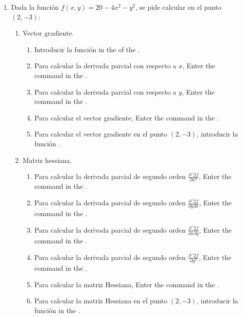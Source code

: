 \begin{enumerate}[leftmargin=*]
\item Dada la función $f(x,y)=20-4x^2-y^2$, se pide calcular en el punto $(2,-3)$:
      \begin{enumerate}
      \item Vector gradiente.
            \begin{indication}
            \begin{enumerate}
            \item Introducir la función  in the  of the  .
            \item Para calcular la derivada parcial con respecto a $x$, Enter the command  in the .
            \item Para calcular la derivada parcial con respecto a $y$, Enter the command  in the .
            \item Para calcular el vector gradiente, Enter the command  in the .
            \item Para calcular el vector gradiente en el punto $(2,-3)$, introducir la función .
            \end{enumerate}
            \end{indication}

      \item Matriz hessiana.
            \begin{indication}
            \begin{enumerate}
            \item Para calcular la derivada parcial de segundo orden $\frac{\partial\^2 f}{\partial x^2}$, Enter the command  in the .
            \item Para calcular la derivada parcial de segundo orden $\frac{\partial\^2 f}{\partial y\partial x}$, Enter the command  in the .
            \item Para calcular la derivada parcial de segundo orden $\frac{\partial\^2 f}{\partial x\partial y}$, Enter the command  in the .
            \item Para calcular la derivada parcial de segundo orden $\frac{\partial\^2 f}{\partial y^2}$, Enter the command  in the .
            \item Para calcular la matriz Hessiana, Enter the command  in the .
            \item Para calcular la matriz Hessiana en el punto $(2,-3)$, introducir la función  in the .
            \end{enumerate}
            \end{indication}


\end{enumerate}
\end{enumerate}

